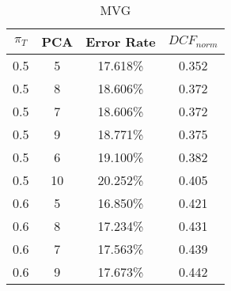 \begin{longtable}{|c|c|c|c|}
\caption{MVG}\label{tab:mvg_acctable}\\
\hline
$\pi_T$ & PCA & Error Rate & $DCF_{norm}$\\
\hline
0.5 & 5 & 17.618\% & 0.352\\
\hline
0.5 & 8 & 18.606\% & 0.372\\
\hline
0.5 & 7 & 18.606\% & 0.372\\
\hline
0.5 & 9 & 18.771\% & 0.375\\
\hline
0.5 & 6 & 19.100\% & 0.382\\
\hline
0.5 & 10 & 20.252\% & 0.405\\
\hline
0.6 & 5 & 16.850\% & 0.421\\
\hline
0.6 & 8 & 17.234\% & 0.431\\
\hline
0.6 & 7 & 17.563\% & 0.439\\
\hline
0.6 & 9 & 17.673\% & 0.442\\
\hline
\end{longtable}
